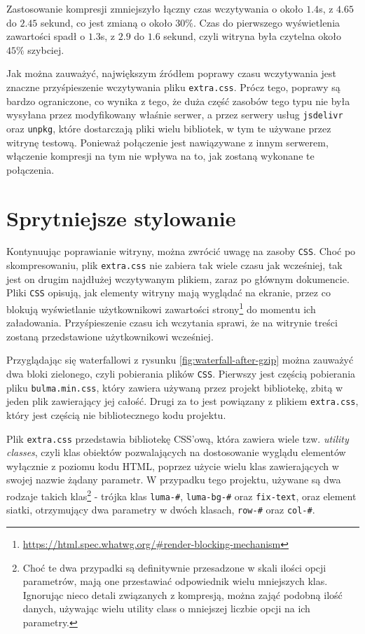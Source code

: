 \documentclass[licencjacka]{pracadypl}
\begin{document}
Zastosowanie kompresji zmniejszyło łączny czas wczytywania o około $1.4$s, z $4.65$ \linebreak do $2.45$ sekund, co jest zmianą o około $30\%$. Czas do pierwszego wyświetlenia zawartości spadł o $1.3$s, z $2.9$ do $1.6$ sekund, czyli witryna była czytelna około $45\%$ szybciej.

Jak można zauważyć, największym źródłem poprawy czasu wczytywania jest znaczne przyśpieszenie wczytywania pliku \texttt{extra.css}. Prócz tego, poprawy są bardzo ograniczone, co wynika z tego, że duża część zasobów tego typu nie była wysyłana przez modyfikowany właśnie serwer, a przez serwery usług \texttt{jsdelivr} oraz \texttt{unpkg}, które dostarczają pliki wielu bibliotek, w tym te używane przez witrynę testową. Ponieważ połączenie jest nawiązywane z innym serwerem, włączenie kompresji na tym nie wpływa na to, jak zostaną wykonane te połączenia.




\section{Sprytniejsze stylowanie}

Kontynuując poprawianie witryny, można zwrócić uwagę na zasoby \texttt{CSS}. Choć po skompresowaniu, plik \texttt{extra.css} nie zabiera tak wiele czasu jak wcześniej, tak jest on drugim najdłużej wczytywanym plikiem, zaraz po głównym dokumencie. Pliki \texttt{CSS} opisują, jak elementy witryny mają wyglądać na ekranie, przez co blokują wyświetlanie użytkownikowi zawartości strony\footnote{\url{https://html.spec.whatwg.org/\#render-blocking-mechanism}} do momentu ich załadowania. Przyśpieszenie czasu ich wczytania sprawi, że na witrynie treści zostaną przedstawione użytkownikowi wcześniej.

Przyglądając się waterfallowi z rysunku \ref{fig:waterfall-after-gzip} można zauważyć dwa bloki zielonego, czyli pobierania plików \texttt{CSS}. Pierwszy jest częścią pobierania pliku \texttt{bulma.min.css}, który zawiera używaną przez projekt bibliotekę, zbitą w jeden plik zawierający jej całość. Drugi za to jest powiązany z plikiem \texttt{extra.css}, który jest częścią nie bibliotecznego kodu projektu.

Plik \texttt{extra.css} przedstawia bibliotekę CSS'ową, która zawiera wiele tzw. \emph{utility classes}, czyli klas obiektów pozwalających na dostosowanie wyglądu elementów wyłącznie z poziomu kodu HTML, poprzez użycie wielu klas zawierających w swojej nazwie żądany parametr. W przypadku tego projektu, używane są dwa rodzaje takich klas\footnote{Choć te dwa przypadki są definitywnie przesadzone w skali ilości opcji parametrów, mają one przestawiać odpowiednik wielu mniejszych klas. Ignorując nieco detali związanych z kompresją, można zająć podobną ilość danych, używając wielu utility class o mniejszej liczbie opcji na ich parametry.} - trójka klas \texttt{luma-\#}, \texttt{luma-bg-\#} oraz \texttt{fix-text}, oraz element siatki, otrzymujący dwa parametry w dwóch klasach, \texttt{row-\#} oraz \texttt{col-\#}.
\end{document}

